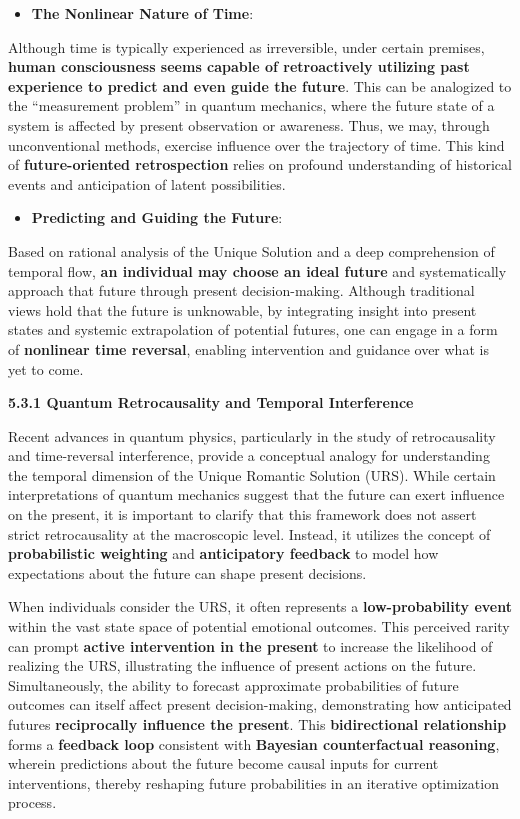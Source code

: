 \documentclass[a4paper]{article}
\begin{document}
\begin{itemize}[series=listWWNumxv,label=[F0B7?]]
\item \textbf{The Nonlinear Nature of Time}:
\end{itemize}
Although time is typically experienced as irreversible, under certain premises, \textbf{human consciousness seems
capable of retroactively utilizing past experience to predict and even guide the future}. This can be analogized to the
“measurement problem” in quantum mechanics, where the future state of a system is affected by present observation or
awareness. Thus, we may, through unconventional methods, exercise influence over the trajectory of time. This kind of
\textbf{future-oriented retrospection} relies on profound understanding of historical events and anticipation of latent
possibilities.

\begin{itemize}[resume*=listWWNumxv]
\item \textbf{Predicting and Guiding the Future}:
\end{itemize}
Based on rational analysis of the Unique Solution and a deep comprehension of temporal flow, \textbf{an individual may
choose an ideal future} and systematically approach that future through present decision-making. Although traditional
views hold that the future is unknowable, by integrating insight into present states and systemic extrapolation of
potential futures, one can engage in a form of \textbf{nonlinear time reversal}, enabling intervention and guidance
over what is yet to come.

\textbf{5.3.1 Quantum Retrocausality and Temporal Interference}

Recent advances in quantum physics, particularly in the study of retrocausality and time-reversal interference, provide
a conceptual analogy for understanding the temporal dimension of the Unique Romantic Solution (URS). While certain
interpretations of quantum mechanics suggest that the future can exert influence on the present, it is important to
clarify that this framework does not assert strict retrocausality at the macroscopic level. Instead, it utilizes the
concept of \textbf{probabilistic weighting} and \textbf{anticipatory feedback} to model how expectations about the
future can shape present decisions.

When individuals consider the URS, it often represents a \textbf{low-probability event} within the vast state space of
potential emotional outcomes. This perceived rarity can prompt \textbf{active intervention in the present} to increase
the likelihood of realizing the URS, illustrating the influence of present actions on the future. Simultaneously, the
ability to forecast approximate probabilities of future outcomes can itself affect present decision-making,
demonstrating how anticipated futures \textbf{reciprocally influence the present}. This \textbf{bidirectional
relationship} forms a \textbf{feedback loop} consistent with \textbf{Bayesian counterfactual reasoning}, wherein
predictions about the future become causal inputs for current interventions, thereby reshaping future probabilities in
an iterative optimization process.
\end{document}
